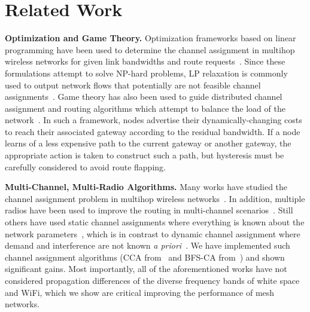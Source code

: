 \section{Related Work}
\label{sec:related}

{\bf Optimization and Game Theory.} Optimization frameworks based on linear programming
have been used to determine the channel assignment in multihop wireless networks for given 
link bandwidths and route requests~\cite{tang2005interference}.  Since these formulations 
attempt to solve NP-hard problems, LP relaxation is commonly used to output network flows 
that potentially are not feasible channel assignments~\cite{si2010overview}. 
Game theory has also been used to guide distributed channel assignment and routing 
algorithms which attempt to balance the load of the network~\cite{raniwala2005architecture,
wang2010game}.  In such a framework, nodes advertise their dynamically-changing costs 
to reach their associated gateway according to the residual bandwidth. If a node learns of
a less expensive path to the current gateway or another gateway, the appropriate action is
taken to construct such a path, but hysteresis must be carefully considered to avoid route flapping.

{\bf Multi-Channel, Multi-Radio Algorithms.} Many works have studied the channel assignment problem in multihop wireless
networks~\cite{jain2005impact,akyildiz2005wireless,raniwala2004centralized}.
In addition, multiple radios have been used to improve the routing in multi-channel
scenarios~\cite{draves2004routing}. Still others have used static channel assignments
where everything is known about the network parameters~\cite{subramanian2008minimum},
which is in contrast to dynamic channel assignment where demand and interference are 
not known {\it a priori}~\cite{wu2006analysis,ramachandran2006interference}. 
We have implemented such channel assignment algorithms (CCA from~\cite{draves2004routing} and 
BFS-CA from~\cite{ramachandran2006interference}) and shown significant gains.  
Most importantly, all of the aforementioned works have not considered propagation 
differences of the diverse frequency bands of white space and WiFi, which we show are 
critical improving the performance of mesh networks.
% 
% 
%



